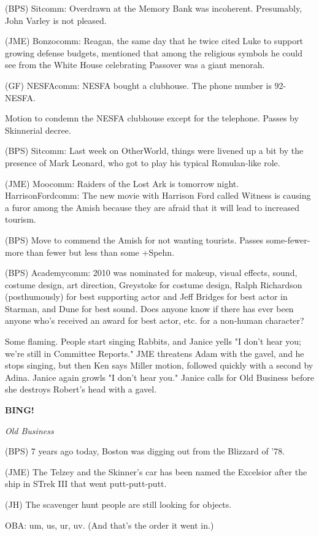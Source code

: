 \documentclass[12pt]{article}
\newcommand{\bing}{{\bf BING!} }
\newcommand{\goto}[1]{\bing \vskip 12pt \centerline{{\em{#1}}}}
\begin{document}
(BPS) Sitcomm: Overdrawn at the Memory Bank was incoherent. Presumably, John Varley is not pleased.

(JME) Bonzocomm: Reagan, the same day that he twice cited Luke to support growing defense budgets, mentioned that among the religious symbols he could see from the White House celebrating Passover was a giant menorah.

(GF) NESFAcomm: NESFA bought a clubhouse. The phone number is 92-NESFA.

Motion to condemn the NESFA clubhouse except for the telephone. Passes by Skinnerial decree.

(BPS) Sitcomm: Last week on OtherWorld, things were livened up a bit by the presence of Mark Leonard, who got to play his typical Romulan-like role.

(JME) Moocomm: Raiders of the Lost Ark is tomorrow night. HarrisonFordcomm: The new movie with Harrison Ford called Witness is causing a furor among the Amish because they are afraid that it will lead to increased tourism.

(BPS) Move to commend the Amish for not wanting tourists. Passes some-fewer-more than fewer but less than some +Spehn.

(BPS) Academycomm: 2010 was nominated for makeup, visual effects, sound, costume design, art direction, Greystoke for costume design, Ralph Richardson (posthumously) for best supporting actor and Jeff Bridges for best actor in Starman, and Dune for best sound. Does anyone know if there has ever been anyone who's received an award for best actor, etc. for a non-human character?

Some flaming. People start singing Rabbits, and Janice yells "I don't hear you; we're still in Committee Reports." JME threatens Adam with the gavel, and he stops singing, but then Ken says Miller motion, followed quickly with a second by Adina. Janice again growls "I don't hear you." Janice calls for Old Business before she destroys Robert's head with a gavel.

\goto{Old Business}

(BPS) 7 years ago today, Boston was digging out from the Blizzard of '78.

(JME) The Telzey and the Skinner's car has been named the Excelsior after the ship in STrek III that went putt-putt-putt.

(JH) The scavenger hunt people are still looking for objects.

OBA: um, us, ur, uv. (And that's the order it went in.)
\end{document}
